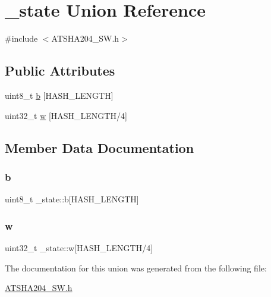 \hypertarget{union__state}{}\section{\+\_\+state Union Reference}
\label{union__state}


{\ttfamily \#include $<$A\+T\+S\+H\+A204\+\_\+\+S\+W.\+h$>$}

\subsection*{Public Attributes}
\begin{DoxyCompactItemize}
\item 
uint8\+\_\+t \hyperlink{union__state_a21b593a11ba9d61bc9ec7a4df09ccd74}{b} \mbox{[}H\+A\+S\+H\+\_\+\+L\+E\+N\+G\+TH\mbox{]}
\item 
uint32\+\_\+t \hyperlink{union__state_a4a2bdbe0a1e0191bd3241c1ef751007f}{w} \mbox{[}H\+A\+S\+H\+\_\+\+L\+E\+N\+G\+TH/4\mbox{]}
\end{DoxyCompactItemize}


\subsection{Member Data Documentation}
\mbox{\label{union__state_a21b593a11ba9d61bc9ec7a4df09ccd74}} 
\subsubsection{\texorpdfstring{b}{b}}
{\footnotesize\ttfamily uint8\+\_\+t \+\_\+state\+::b\mbox{[}H\+A\+S\+H\+\_\+\+L\+E\+N\+G\+TH\mbox{]}}

\mbox{\label{union__state_a4a2bdbe0a1e0191bd3241c1ef751007f}} 
\subsubsection{\texorpdfstring{w}{w}}
{\footnotesize\ttfamily uint32\+\_\+t \+\_\+state\+::w\mbox{[}H\+A\+S\+H\+\_\+\+L\+E\+N\+G\+TH/4\mbox{]}}



The documentation for this union was generated from the following file\+:\begin{DoxyCompactItemize}
\item 
\hyperlink{ATSHA204__SW_8h}{A\+T\+S\+H\+A204\+\_\+\+S\+W.\+h}\end{DoxyCompactItemize}
